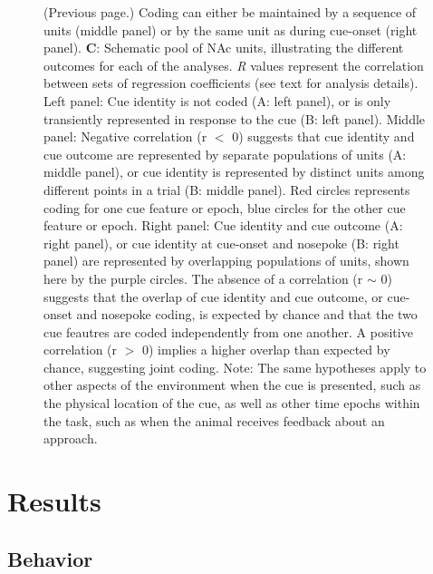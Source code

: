\documentclass[11pt]{article}
\newcommand{\bsf}[1]{\textbf{#1}}
\providecommand{\DIFaddend}{} %
\DeclareRobustCommand{\DIFaddend}{\DIFOaddend \let\includegraphics\DIFOincludegraphics} %
\begin{document}
\addtocounter{figure}{-1}
\begin{figure} [t!]
  \caption{(Previous page.) Coding can either be maintained by a sequence
  of units (middle panel) or by the same unit as during cue-onset
  (right panel). \bsf{C}: Schematic pool of NAc units,
    illustrating the different outcomes for each of the analyses. {\it
      R} values represent the correlation between sets of regression
    coefficients (see text for analysis details). Left panel: Cue
    identity is not coded (A: left panel), or is only transiently
    represented in response to the cue (B: left panel). Middle panel:
    Negative correlation (r $<$ 0) suggests that cue identity and cue
    outcome are represented by separate populations of units (A:
    middle panel), or cue identity is represented by distinct units
    among different points in a trial (B: middle panel). Red circles
    represents coding for one cue feature or epoch, blue circles for
    the other cue feature or epoch. Right panel: Cue identity and cue
    outcome (A: right panel), or cue identity at cue-onset and
    nosepoke (B: right panel) are represented by overlapping
    populations of units, shown here by the purple circles. The
    absence of a correlation (r $\sim$ 0) suggests that the overlap of
    cue identity and cue outcome, or cue-onset and nosepoke coding, is
    expected by chance and that the two cue feautres are coded independently from one another. A positive correlation (r $>$ 0)
    implies a higher overlap than expected by chance, suggesting joint coding. Note: The same hypotheses apply to other aspects of the environment when the cue is presented, such as the physical location of the cue, as well as other time epochs within the task, such as when the animal receives feedback about an approach.}%
\end{figure}

\DIFaddend \section*{Results}

\subsection*{Behavior}
\end{document}
